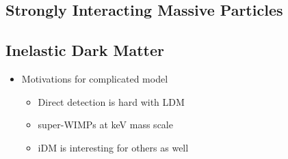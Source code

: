 \subsection{Strongly Interacting Massive Particles}
\label{sec:theory-simps}

\subsection{Inelastic Dark Matter}
\label{sec:theory-idm}


\begin{itemize}
    \item Motivations for complicated model
          \begin{itemize}
              \item Direct detection is hard with LDM \cite{ldmconstraints-2019}
              \item super-WIMPs at keV mass scale \cite{superwimps-2008}
              \item iDM is interesting for others as well \cite{darkseaquest-2018}
          \end{itemize}
\end{itemize}

